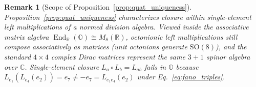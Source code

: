 \documentclass[aps,prd,onecolumn,tightenlines,nofootinbib,notitlepage,11pt,floatfix]{revtex4-2}
\theoremstyle{indentedtheorem}
\newtheorem{remark}{Remark}
\begin{document}
\begin{remark}[Scope of Proposition~\ref{prop:quat_uniqueness}]
\label{rem:quat_uniqueness_scope}
Proposition~\ref{prop:quat_uniqueness} characterizes closure within single-element left multiplications of a normed division algebra. Viewed inside the associative matrix algebra $\operatorname{End}_{\mathbb{R}}(\mathbb{O})\cong M_8(\mathbb{R})$, octonionic left multiplications still compose associatively as matrices (unit octonions generate $\mathrm{SO}(8)$), and the standard $4\times 4$ complex Dirac matrices represent the same $3+1$ spinor algebra over $\mathbb{C}$. Single-element closure $L_a\circ L_b = L_{ab}$ fails in $\mathbb{O}$ because $L_{e_1}(L_{e_4}(e_2)) = e_7 \neq -e_7 = L_{e_1 e_4}(e_2)$ under Eq.~\eqref{eq:fano_triples}.
\end{remark}
\end{document}

